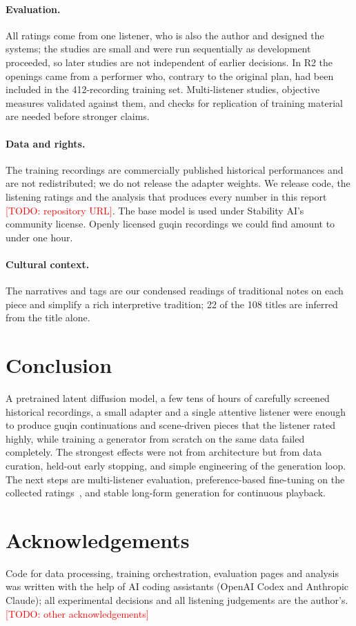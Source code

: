 \documentclass[11pt]{article}
\newcommand{\todo}[1]{\textcolor{red}{[TODO: #1]}}
\begin{document}
\paragraph{Evaluation.} All ratings come from one listener, who is also the author and designed the systems; the
studies are small and were run sequentially as development proceeded, so later studies are not independent of
earlier decisions. In R2 the openings came from a performer who, contrary to the original plan, had been included
in the 412-recording training set. Multi-listener studies, objective measures validated against them, and checks
for replication of training material~\citep{batlleroca2024replication} are needed before stronger claims.

\paragraph{Data and rights.} The training recordings are commercially published historical performances and are
not redistributed; we do not release the adapter weights. We release code, the listening ratings and the
analysis that produces every number in this report \todo{repository URL}. The base model is used under
Stability AI's community license. Openly licensed guqin recordings we could find amount to under one hour.

\paragraph{Cultural context.} The narratives and tags are our condensed readings of traditional notes on each
piece and simplify a rich interpretive tradition; 22 of the 108 titles are inferred from the title alone.

\section{Conclusion}

A pretrained latent diffusion model, a few tens of hours of carefully screened historical recordings, a small
adapter and a single attentive listener were enough to produce guqin continuations and scene-driven pieces that
the listener rated highly, while training a generator from scratch on the same data failed completely. The
strongest effects were not from architecture but from data curation, held-out early stopping, and simple
engineering of the generation loop. The next steps are multi-listener evaluation, preference-based fine-tuning
on the collected ratings~\citep{wallace2023diffusiondpo}, and stable long-form generation for continuous playback.

\section*{Acknowledgements}
Code for data processing, training orchestration, evaluation pages and analysis was written with the help of
AI coding assistants (OpenAI Codex and Anthropic Claude); all experimental decisions and all listening judgements
are the author's. \todo{other acknowledgements}



\end{document}
